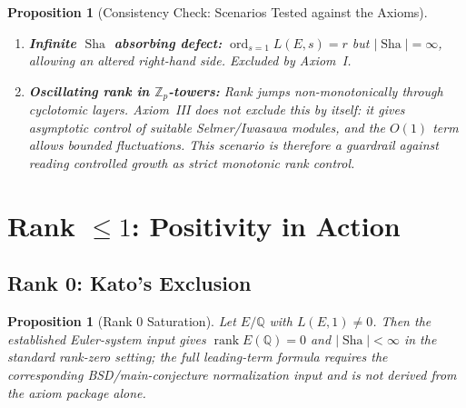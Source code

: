 \documentclass[aps,prd,twocolumn,superscriptaddress,nofootinbib,floatfix]{revtex4-2}
\newtheorem{proposition}[theorem]{Proposition}
\theoremstyle{definition}
\theoremstyle{remark}
\DeclareMathOperator{\ord}{ord}
\DeclareMathOperator{\rank}{rank}
\DeclareMathOperator{\Sha}{Sha}
\begin{document}
\begin{proposition}[Consistency Check: Scenarios Tested against the Axioms]
\begin{enumerate}
\item[\textbf{(E3)}] \textbf{Infinite $\Sha$ absorbing defect:} $\ord_{s=1} L(E,s) = r$ but $|\Sha| = \infty$, allowing an altered right-hand side. Excluded by Axiom~I.

\item[\textbf{(E4)}] \textbf{Oscillating rank in $\mathbb{Z}_p$-towers:} Rank jumps non-monotonically through cyclotomic layers. Axiom~III does not exclude this by itself: it gives asymptotic control of suitable Selmer/Iwasawa modules, and the $O(1)$ term allows bounded fluctuations. This scenario is therefore a guardrail against reading controlled growth as strict monotonic rank control.
\end{enumerate}
\end{proposition}


\clearpage
\section{\texorpdfstring{Rank $\leq 1$: Positivity in Action}{Rank <= 1: Positivity in Action}}
\label{sec:rank01}

\subsection{Rank 0: Kato's Exclusion}

\begin{proposition}[Rank 0 Saturation]
\label{prop:rank0}
Let $E/\mathbb{Q}$ with $L(E,1) \neq 0$. Then the established Euler-system input gives $\rank E(\mathbb{Q}) = 0$ and $|\Sha| < \infty$ in the standard rank-zero setting; the full leading-term formula requires the corresponding BSD/main-conjecture normalization input and is not derived from the axiom package alone.
\end{proposition}
\end{document}
